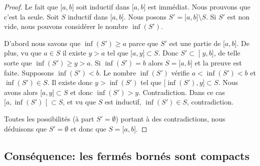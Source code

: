 \begin{proof}
    Le fait que \( \mathopen[ a , b \mathclose]\) soit inductif dans \( \mathopen[ a , b \mathclose]\) est immédiat. Nous prouvons que c'est la seule. Soit \( S\) inductif dans \( \mathopen[ a , b \mathclose]\). Nous posons \( S'=\mathopen[ a , b \mathclose]\setminus S\). Si \( S'\) est non vide, nous pouvons considérer le nombre \( \inf(S')\).

    \begin{subproof}
            D'abord nous savons que \( \inf(S')\geq a\) parce que \( S'\) est une partie de \( \mathopen[ a , b \mathclose]\). De plus, vu que \( a\in S\) il existe \( y>a\) tel que \( \mathopen[ a , y \mathclose]\subset S\). Donc \( S'\subset\mathopen] y , b \mathclose]\), de telle sorte que \( \inf(S')\geq y>a\).
        \spitem[Si \( \inf(S')\in S\)]
        Si \( \inf(S')=b\) alors \( S=\mathopen[ a , b \mathclose]\) et la preuve est faite. Supposons \( \inf(S')<b\). Le nombre \( \inf(S')\) vérifie \( a<\inf(S')<b\) et \( \inf(S')\in S\). Il existe donc \( y>\inf(S')\) tel que \( \mathopen[ \inf(S') , y \mathclose]\subset S\). Nous avons alors \( \mathopen[ a , y \mathclose]\subset S\) et donc \( \inf(S')>y\). Contradiction.
        \spitem[Si \( \inf(S')\in S'\)]
        Dans ce cas \( \mathopen[ a , \inf(S') \mathclose[\subset S\), et vu que \(S \) est inductif, \( \inf(S')\in S\), contradiction.
    \end{subproof}
    Toutes les possibilités (à part \( S'=\emptyset\)) portant à des contradictions, nous déduisons que \( S'=\emptyset\) et donc que \( S=\mathopen[ a , b \mathclose]\).
\end{proof}

\subsection{Conséquence: les fermés bornés sont compacts}

